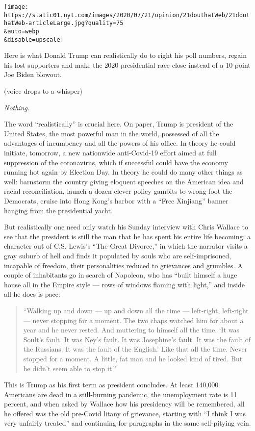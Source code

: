 \texttt{[image: https://static01.nyt.com/images/2020/07/21/opinion/21douthatWeb/21douthatWeb-articleLarge.jpg?quality=75\\\&auto=webp\\\&disable=upscale]}

Here is what Donald Trump can realistically do to right his poll
numbers, regain his lost supporters and make the 2020 presidential race
close instead of a 10-point Joe Biden blowout.

(voice drops to a whisper)

\emph{Nothing.}

The word ``realistically'' is crucial here. On paper, Trump is president
of the United States, the most powerful man in the world, possessed of
all the advantages of incumbency and all the powers of his office. In
theory he could initiate, tomorrow, a new nationwide anti-Covid-19
effort aimed at full suppression of the coronavirus, which if successful
could have the economy running hot again by Election Day. In theory he
could do many other things as well: barnstorm the country giving
eloquent speeches on the American idea and racial reconciliation, launch
a dozen clever policy gambits to wrong-foot the Democrats, cruise into
Hong Kong's harbor with a ``Free Xinjiang'' banner hanging from the
presidential yacht.

But realistically one need only watch his Sunday interview with Chris
Wallace to see that the president is still the man that he has spent his
entire life becoming: a character out of C.S. Lewis's ``The Great
Divorce,'' in which the narrator visits a gray suburb of hell and finds
it populated by souls who are self-imprisoned, incapable of freedom,
their personalities reduced to grievances and grumbles. A couple of
inhabitants go in search of Napoleon, who has ``built himself a huge
house all in the Empire style --- rows of windows flaming with light,''
and inside all he does is pace:

\begin{quote}
``Walking up and down --- up and down all the time --- left-right,
left-right --- never stopping for a moment. The two chaps watched him
for about a year and he never rested. And muttering to himself all the
time. `It was Soult's fault. It was Ney's fault. It was Josephine's
fault. It was the fault of the Russians. It was the fault of the
English.' Like that all the time. Never stopped for a moment. A little,
fat man and he looked kind of tired. But he didn't seem able to stop
it.''
\end{quote}

This is Trump as his first term as president concludes. At least 140,000
Americans are dead in a still-burning pandemic, the unemployment rate is
11 percent, and when asked by Wallace how his presidency will be
remembered, all he offered was the old pre-Covid litany of grievance,
starting with ``I think I was very unfairly treated'' and continuing for
paragraphs in the same self-pitying vein.

